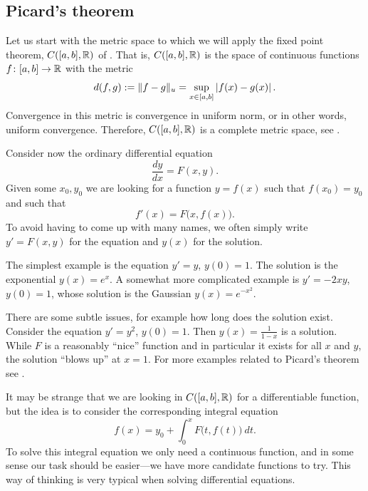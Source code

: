 \subsection{Picard's theorem}

Let us start with the metric space to which we will apply the
fixed point theorem,
$C([a,b],{\mathbb{R}})$ of .  That is, $C([a,b],{\mathbb{R}})$
is the space of continuous functions $f \colon [a,b] \to {\mathbb{R}}$ with the metric
\begin{equation*}
d(f,g) := \lVert {f-g} \rVert_u = \sup_{x \in [a,b]} \left\lvert {f(x)-g(x)} \right\rvert .
\end{equation*}
Convergence in this metric is convergence in uniform norm, or in other
words, uniform convergence.  Therefore,
$C([a,b],{\mathbb{R}})$ is a complete metric space,
see .

\medskip

Consider now the ordinary differential equation
\begin{equation*}
\frac{dy}{dx} = F(x,y) .
\end{equation*}
Given some $x_0, y_0$ we are looking for a function $y=f(x)$ such that
$f(x_0) = y_0$ and such that
\begin{equation*}
f'(x) = F\bigl(x,f(x)\bigr) .
\end{equation*}
To avoid having to come up with many names, we often simply write $y' = F(x,y)$
for the equation
and $y(x)$ for the solution.

The simplest example is the equation $y' = y$, $y(0) = 1$.
The solution is the exponential $y(x) = e^x$.  A somewhat more complicated
example is $y' = -2xy$, $y(0) = 1$, whose solution is the Gaussian
$y(x) = e^{-x^2}$.

There are some subtle issues, for example how long does the
solution exist.
Consider the equation $y' = y^2$, $y(0)=1$.  Then $y(x) = \frac{1}{1-x}$ is a
solution.  While $F$ is a reasonably ``nice'' function and in particular
it exists for all $x$ and $y$, the solution ``blows up'' at $x=1$.
For more examples related to Picard's theorem see .

It may be strange that we are looking in $C([a,b],{\mathbb{R}})$ for a differentiable
function, but the idea is to consider the corresponding
integral equation
\begin{equation*}
f(x)
=
y_0 + \int_0^x F\bigl(t,f(t)\bigr)~dt .
\end{equation*}
To solve this integral equation we only need a continuous function, and
in some sense our task should be easier---we have more candidate functions
to try.  This way of thinking is very typical when solving differential
equations.

